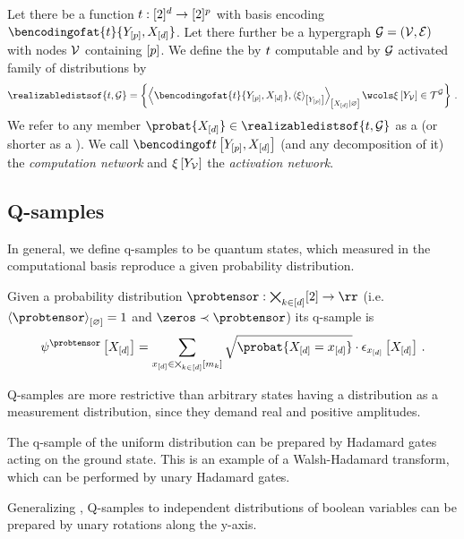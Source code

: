 \begin{definition}[\ComputationActivationNetwork{} (\CompActNets{})]
    \label{def:compActNets}
    Let there be a function $t : [2]^{d} \allowbreak \rightarrow [2]^{p}$ with basis encoding $\bencodingofat{\sstat}{\headvariables,\shortcatvariables}$.
    Let there further be a hypergraph $\mathcal{G}=(\mathcal{V},\mathcal{E})$ with nodes $\mathcal{V}$ containing $[p]$.
    We define the by $t$ computable and by $\mathcal{G}$ activated family of distributions by
    \begin{align*}
        \realizabledistsof{\sstat,\graph}
        = \left\{ \normalizationof{\bencodingofat{\sstat}{\headvariables,\shortcatvariables},\contractionof{\acttensor}{\headvariables} %
        }{\shortcatvariables}
              \wcols \acttensorat{\headvariableof{\nodes}} \in \tnsetof{\graph} \right\} \, .
    \end{align*}
    We refer to any member $\probat{\shortcatvariables}\in\realizabledistsof{\sstat,\graph}$ as a \emph{\ComputationActivationNetwork{}} (or shorter as a \emph{\CompActNet{}}).
    We call $\bencsstatwith$ (and any decomposition of it) the \emph{computation network} and $\xi\left[Y_{\mathcal{V}}\right]$ the \emph{activation network}.
\end{definition}

\subsection{Q-samples}

In general, we define q-samples to be quantum states, which measured in the computational basis reproduce a given probability distribution.

\begin{definition}
    Given a probability distribution $\probtensor:\atomstates\rightarrow\rr$ (i.e. $\contraction{\probtensor}=1$ and $\zeros \prec \probtensor$) its q-sample is
    \begin{align*}
        \qstateofat{\probtensor}{\shortcatvariables}
        = \sum_{\shortcatindicesin} \sqrt{\probat{\indexedshortcatvariables}} \cdot \onehotmapofat{\shortcatindices}{\shortcatvariables} \, .
    \end{align*}
\end{definition}

Q-samples are more restrictive than arbitrary states having a distribution as a measurement distribution, since they demand real and positive amplitudes.

\begin{example}
    \label{exa:qSampleUniform}
    The q-sample of the uniform distribution can be prepared by Hadamard gates acting on the ground state.
    This is an example of a Walsh-Hadamard transform, which can be performed by unary Hadamard gates.
\end{example}

Generalizing , Q-samples to independent distributions of boolean variables can be prepared by unary rotations along the y-axis.
